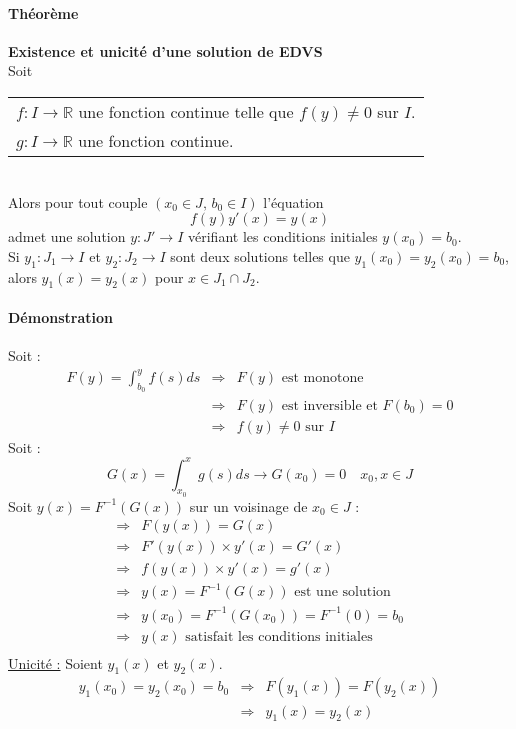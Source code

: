 \message{ !name(analyse-02.tex)}\documentclass[1Opt]{report}
\begin{document}
\paragraph{Théorème}
\textbf{Existence et unicité d'une solution de EDVS} \\
Soit
\begin{tabular}{l}
  $f:I\rightarrow{\mathbb R}$ une fonction continue telle que $f(y)\neq0$ sur $I$. \\
  $g:I\rightarrow{\mathbb R}$ une fonction continue.
\end{tabular} \\
Alors pour tout couple $(x_0\in J,\,b_0\in I)$ l'équation
\begin{equation*}
  f(y)y'(x)=y(x) \tag{$\ast \ast$}
\end{equation*}
admet une solution $y:J'\rightarrow I$ vérifiant les conditions initiales
$y(x_0)=b_0$. \\
Si $y_1:J_1\rightarrow I$ et $y_2:J_2\rightarrow I$ sont deux solutions telles
que $y_1(x_0)=y_2(x_0)=b_0$, alors $y_1(x)=y_2(x)$ pour $x\in J_1\cap J_2$.

\paragraph{Démonstration}
Soit :
\begin{eqnarray*}
  F(y)=\int_{b_0}^y f(s)ds & \Rightarrow & F(y) \mbox{ est monotone} \\
  & \Rightarrow & F(y) \mbox{ est inversible et } F(b_0)=0 \\
  & \Rightarrow & f(y)\neq0 \mbox{ sur } I
\end{eqnarray*}
Soit :
\[ G(x)=\int^x_{x_0}g(s)ds\rightarrow G(x_0)=0 \quad x_0,x\in J \]
Soit $y(x)=F^{-1}(G(x))$ sur un voisinage de $x_0\in J$ :
\begin{eqnarray*}
  \Rightarrow & F(y(x))=G(x) \\
  \Rightarrow & F'(y(x))\times y'(x)=G'(x) \\
  \Rightarrow & f(y(x))\times y'(x)=g'(x) \\
  \Rightarrow & y(x)=F^{-1}(G(x)) \mbox{ est une solution} \\
  \Rightarrow & y(x_0)=F^{-1}(G(x_0))=F^{-1}(0)=b_0 \\
  \Rightarrow & y(x) \mbox{ satisfait les conditions initiales} \\
\end{eqnarray*}
\underline{Unicité :} Soient $y_1(x)$ et $y_2(x)$.
\begin{eqnarray*}
  y_1(x_0)=y_2(x_0)=b_0 & \Rightarrow & F(y_1(x))=F(y_2(x)) \\
  & \Rightarrow & y_1(x)=y_2(x)
\end{eqnarray*}
\end{document}
